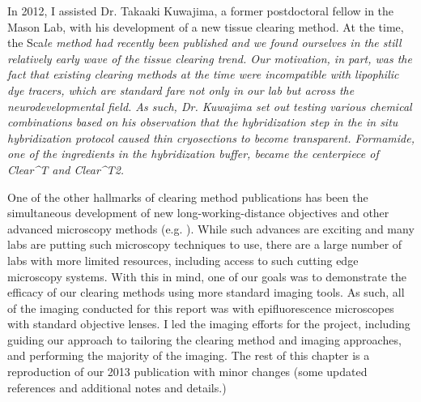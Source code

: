 In 2012, I assisted Dr. Takaaki Kuwajima, a former postdoctoral fellow in the Mason Lab, with his development of a new tissue clearing method.
At the time, the Sca\it{l}e method had recently been published \cite{hama2011scale} and we found ourselves in the still relatively early wave of the tissue clearing trend.
Our motivation, in part, was the fact that existing clearing methods at the time were incompatible with lipophilic dye tracers, which are standard fare not only in our lab but across the neurodevelopmental field.
As such, Dr. Kuwajima set out testing various chemical combinations based on his observation that the hybridization step in the \emph{in situ} hybridization protocol caused thin cryosections to become transparent.
Formamide, one of the ingredients in the hybridization buffer, became the centerpiece of {\it Clear^{T}} and {\it Clear^{T2}}.

One of the other hallmarks of clearing method publications has been the simultaneous development of new long-working-distance objectives and other advanced microscopy methods (e.g. ).
While such advances are exciting and many labs are putting such microscopy techniques to use, there are a large number of labs with more limited resources, including access to such cutting edge microscopy systems.
With this in mind, one of our goals was to demonstrate the efficacy of our clearing methods using more standard imaging tools.
As such, all of the imaging conducted for this report was with epifluorescence microscopes with standard objective lenses.
I led the imaging efforts for the project, including guiding our approach to tailoring the clearing method and imaging approaches, and performing the majority of the imaging.
The rest of this chapter is a reproduction of our 2013 publication \cite{kuwajima2013cleart} with minor changes (some updated references and additional notes and details.)
